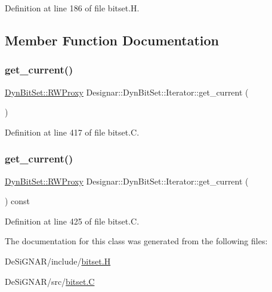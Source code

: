 Definition at line 186 of file bitset.\+H.



\subsection{Member Function Documentation}
\mbox{\label{class_designar_1_1_dyn_bit_set_1_1_iterator_a413eba67b23a9400666c18845bbe795a}} 
\subsubsection{\texorpdfstring{get\+\_\+current()}{get\_current()}\hspace{0.1cm}{\footnotesize\ttfamily [1/2]}}
{\footnotesize\ttfamily \hyperlink{class_designar_1_1_dyn_bit_set_1_1_r_w_proxy}{Dyn\+Bit\+Set\+::\+R\+W\+Proxy} Designar\+::\+Dyn\+Bit\+Set\+::\+Iterator\+::get\+\_\+current (\begin{DoxyParamCaption}{ }\end{DoxyParamCaption})}



Definition at line 417 of file bitset.\+C.

\mbox{\label{class_designar_1_1_dyn_bit_set_1_1_iterator_a034af8ec4f70d792837cab4923799e9f}} 
\subsubsection{\texorpdfstring{get\+\_\+current()}{get\_current()}\hspace{0.1cm}{\footnotesize\ttfamily [2/2]}}
{\footnotesize\ttfamily \hyperlink{class_designar_1_1_dyn_bit_set_1_1_r_w_proxy}{Dyn\+Bit\+Set\+::\+R\+W\+Proxy} Designar\+::\+Dyn\+Bit\+Set\+::\+Iterator\+::get\+\_\+current (\begin{DoxyParamCaption}{ }\end{DoxyParamCaption}) const}



Definition at line 425 of file bitset.\+C.



The documentation for this class was generated from the following files\+:\begin{DoxyCompactItemize}
\item 
De\+Si\+G\+N\+A\+R/include/\hyperlink{bitset_8_h}{bitset.\+H}\item 
De\+Si\+G\+N\+A\+R/src/\hyperlink{bitset_8_c}{bitset.\+C}\end{DoxyCompactItemize}
